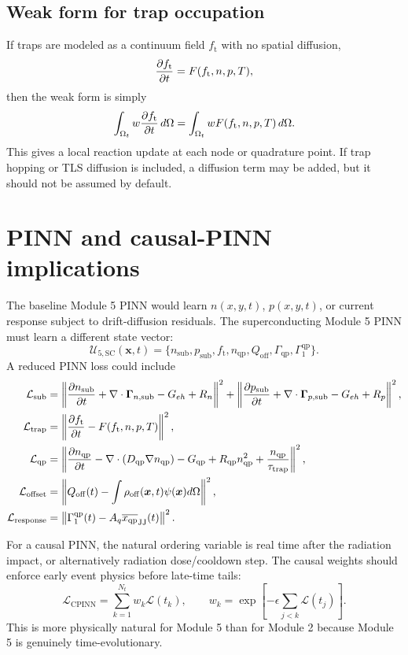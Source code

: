 \documentclass[11pt]{article}
\newcommand{\Om}{\Omega}
\newcommand{\x}{\bm{x}}
\newcommand{\nqp}{n_{\mathrm{qp}}}
\newcommand{\xqp}{x_{\mathrm{qp}}}
\newcommand{\Dqp}{D_{\mathrm{qp}}}
\newcommand{\Gqp}{G_{\mathrm{qp}}}
\newcommand{\Rqp}{R_{\mathrm{qp}}}
\newcommand{\tautrap}{\tau_{\mathrm{trap}}}
\newcommand{\GammaQP}{\Gamma_{\mathrm{qp}}}
\newcommand{\Qoff}{Q_{\mathrm{off}}}
\newcommand{\ft}{f_{\mathrm{t}}}
\newcommand{\rhooff}{\rho_{\mathrm{off}}}
\newcommand{\wpot}{\psi}
\begin{document}
\subsection{Weak form for trap occupation}

If traps are modeled as a continuum field \(\ft\) with no spatial diffusion,
\begin{equation}
\pdv{\ft}{t}=F(\ft,n,p,T),
\end{equation}
then the weak form is simply
\begin{equation}
\int_{\Om_t} w\pdv{\ft}{t}\,d\Om=\int_{\Om_t}wF(\ft,n,p,T)\,d\Om.
\end{equation}
This gives a local reaction update at each node or quadrature point. If trap hopping or TLS diffusion is included, a diffusion term may be added, but it should not be assumed by default.

\section{PINN and causal-PINN implications}

The baseline Module 5 PINN would learn \(n(x,y,t)\), \(p(x,y,t)\), or current response subject to drift-diffusion residuals. The superconducting Module 5 PINN must learn a different state vector:
\begin{equation}
\mathcal{U}_{5,\mathrm{SC}}(\x,t)=\{n_{\mathrm{sub}},p_{\mathrm{sub}},\ft,\nqp,\Qoff,\GammaQP,\Gamma_1^{\mathrm{qp}}\}.
\end{equation}
A reduced PINN loss could include
\begin{align}
\mathcal{L}_{\mathrm{sub}} &= \left\|\pdv{n_{\mathrm{sub}}}{t}+\nabla\cdot\bm{\Gamma}_{n,\mathrm{sub}}-G_{eh}+R_n\right\|^2
+\left\|\pdv{p_{\mathrm{sub}}}{t}+\nabla\cdot\bm{\Gamma}_{p,\mathrm{sub}}-G_{eh}+R_p\right\|^2,\\
\mathcal{L}_{\mathrm{trap}} &= \left\|\pdv{\ft}{t}-F(\ft,n,p,T)\right\|^2,\\
\mathcal{L}_{\mathrm{qp}} &= \left\|\pdv{\nqp}{t}-\nabla\cdot(\Dqp\nabla\nqp)-\Gqp+\Rqp\nqp^2+\frac{\nqp}{\tautrap}\right\|^2,\\
\mathcal{L}_{\mathrm{offset}} &= \left\|\Qoff(t)-\int \rhooff(\x,t)\wpot(\x)d\Om\right\|^2,\\
\mathcal{L}_{\mathrm{response}} &= \left\|\Gamma_1^{\mathrm{qp}}(t)-A_q\overline{\xqp}_{\mathrm{JJ}}(t)\right\|^2.
\end{align}

For a causal PINN, the natural ordering variable is real time after the radiation impact, or alternatively radiation dose/cooldown step. The causal weights should enforce early event physics before late-time tails:
\begin{equation}
\mathcal{L}_{\mathrm{CPINN}}=\sum_{k=1}^{N_t} w_k\mathcal{L}(t_k),
\qquad
w_k=\exp\left[-\epsilon\sum_{j<k}\mathcal{L}(t_j)\right].
\end{equation}
This is more physically natural for Module 5 than for Module 2 because Module 5 is genuinely time-evolutionary.
\end{document}
